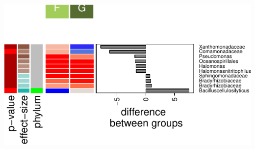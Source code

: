 \documentclass[]{interact}
\theoremstyle{plain}%
\theoremstyle{definition}
\theoremstyle{remark}
\begin{document}
\begin{center}\includegraphics{Doc_pdf_files/figure-latex/unnamed-chunk-34-3} \end{center}
\end{document}
